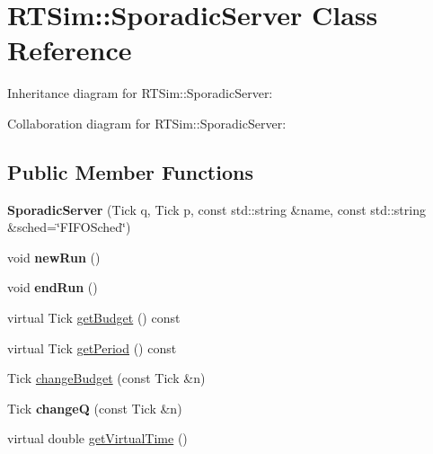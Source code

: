 \hypertarget{classRTSim_1_1SporadicServer}{}\section{R\+T\+Sim\+:\+:Sporadic\+Server Class Reference}
\label{classRTSim_1_1SporadicServer}


Inheritance diagram for R\+T\+Sim\+:\+:Sporadic\+Server\+:


Collaboration diagram for R\+T\+Sim\+:\+:Sporadic\+Server\+:
\subsection*{Public Member Functions}
\begin{DoxyCompactItemize}
\item 
{\bfseries Sporadic\+Server} (Tick q, Tick p, const std\+::string \&name, const std\+::string \&sched=\char`\"{}F\+I\+F\+O\+Sched\char`\"{})\hypertarget{classRTSim_1_1SporadicServer_a89e3dd7dd62c6e42fd8e8bbba74e0613}{}\label{classRTSim_1_1SporadicServer_a89e3dd7dd62c6e42fd8e8bbba74e0613}

\item 
void {\bfseries new\+Run} ()\hypertarget{classRTSim_1_1SporadicServer_a3e4eccf683442de5e1c15e57ea85d30e}{}\label{classRTSim_1_1SporadicServer_a3e4eccf683442de5e1c15e57ea85d30e}

\item 
void {\bfseries end\+Run} ()\hypertarget{classRTSim_1_1SporadicServer_acb8cd5a6ca2e7c868cd65929074f2c1e}{}\label{classRTSim_1_1SporadicServer_acb8cd5a6ca2e7c868cd65929074f2c1e}

\item 
virtual Tick \hyperlink{classRTSim_1_1SporadicServer_a4728b8c0900f65c2c563ab7cbd4393dc}{get\+Budget} () const 
\item 
virtual Tick \hyperlink{classRTSim_1_1SporadicServer_a6f647c0a5319c3faefd6c4ef37b80bad}{get\+Period} () const 
\item 
Tick \hyperlink{classRTSim_1_1SporadicServer_ac33c29485a8a29593a4544846e36602e}{change\+Budget} (const Tick \&n)
\item 
Tick {\bfseries changeQ} (const Tick \&n)\hypertarget{classRTSim_1_1SporadicServer_ae779b16b5aa64ddb1b1eea9cac0f11fe}{}\label{classRTSim_1_1SporadicServer_ae779b16b5aa64ddb1b1eea9cac0f11fe}

\item 
virtual double \hyperlink{classRTSim_1_1SporadicServer_a0b3f265bff5c805b877177cbbc5986df}{get\+Virtual\+Time} ()
\end{DoxyCompactItemize}
